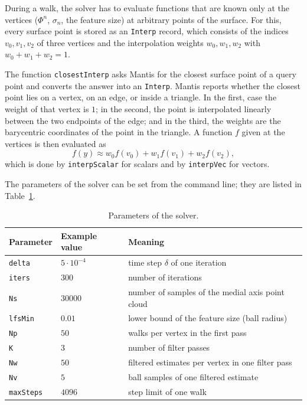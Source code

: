 \documentclass[
]{elteiktdk}[2024/04/26]
\begin{document}
	During a walk, the solver has to evaluate functions that are known only at the vertices ($\Phi^n$, $\sigma_n$, the feature size) at arbitrary points of the surface. For this, every surface point is stored as an \texttt{Interp} record, which consists of the indices $v_0, v_1, v_2$ of three vertices and the interpolation weights $w_0, w_1, w_2$ with $w_0 + w_1 + w_2 = 1$.
	
	The function \texttt{closestInterp} asks Mantis for the closest surface point of a query point and converts the answer into an \texttt{Interp}. Mantis reports whether the closest point lies on a vertex, on an edge, or inside a triangle. In the first, case the weight of that vertex is $1$; in the second, the point is interpolated linearly between the two endpoints of the edge; and in the third, the weights are the barycentric coordinates of the point in the triangle. A function $f$ given at the vertices is then evaluated as
	\[
	f(y) \approx w_0 f(v_0) + w_1 f(v_1) + w_2 f(v_2),
	\]
	which is done by \texttt{interpScalar} for scalars and by \texttt{interpVec} for vectors.
	
	The parameters of the solver can be set from the command line; they are listed in Table~\ref{tab:params}.
	
	\begin{table}[ht]
		\centering
		\begin{tabular}{l l l}
			\hline
			Parameter & Example value & Meaning \\
			\hline
			\texttt{delta} & $5 \cdot 10^{-4}$ & time step $\delta$ of one iteration \\
			\texttt{iters} & $300$ & number of iterations \\
			\texttt{Ns} & $30000$ & number of samples of the medial axis point cloud \\
			\texttt{lfsMin} & $0.01$ & lower bound of the feature size (ball radius) \\
			\texttt{Np} & $50$ & walks per vertex in the first pass \\
			\texttt{K} & $3$ & number of filter passes \\
			\texttt{Nw} & $50$ & filtered estimates per vertex in one filter pass \\
			\texttt{Nv} & $5$ & ball samples of one filtered estimate \\
			\texttt{maxSteps} & $4096$ & step limit of one walk \\
			\hline
		\end{tabular}
		\caption{Parameters of the solver.}
		\label{tab:params}
	\end{table}
	
\end{document}
